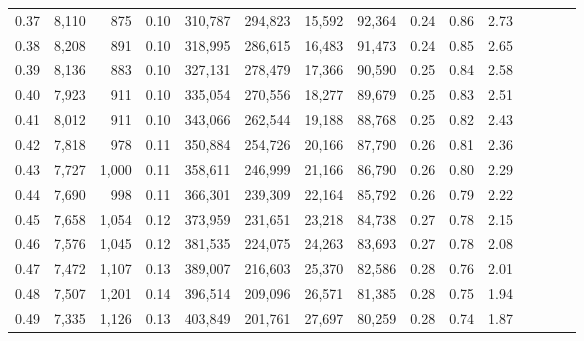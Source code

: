 \begin{tabular}{rrrcrrrrrrrrrrr}
0.37 &  8,110 &    875 &                                       0.10 &  310,787 &  294,823 &   15,592 &   92,364 &  0.24 &  0.86 &                         2.73 \\
0.38 &  8,208 &    891 &                                       0.10 &  318,995 &  286,615 &   16,483 &   91,473 &  0.24 &  0.85 &                         2.65 \\
0.39 &  8,136 &    883 &                                       0.10 &  327,131 &  278,479 &   17,366 &   90,590 &  0.25 &  0.84 &                         2.58 \\
0.40 &  7,923 &    911 &                                       0.10 &  335,054 &  270,556 &   18,277 &   89,679 &  0.25 &  0.83 &                         2.51 \\
0.41 &  8,012 &    911 &                                       0.10 &  343,066 &  262,544 &   19,188 &   88,768 &  0.25 &  0.82 &                         2.43 \\
0.42 &  7,818 &    978 &                                       0.11 &  350,884 &  254,726 &   20,166 &   87,790 &  0.26 &  0.81 &                         2.36 \\
0.43 &  7,727 &  1,000 &                                       0.11 &  358,611 &  246,999 &   21,166 &   86,790 &  0.26 &  0.80 &                         2.29 \\
0.44 &  7,690 &    998 &                                       0.11 &  366,301 &  239,309 &   22,164 &   85,792 &  0.26 &  0.79 &                         2.22 \\
0.45 &  7,658 &  1,054 &                                       0.12 &  373,959 &  231,651 &   23,218 &   84,738 &  0.27 &  0.78 &                         2.15 \\
0.46 &  7,576 &  1,045 &                                       0.12 &  381,535 &  224,075 &   24,263 &   83,693 &  0.27 &  0.78 &                         2.08 \\
0.47 &  7,472 &  1,107 &                                       0.13 &  389,007 &  216,603 &   25,370 &   82,586 &  0.28 &  0.76 &                         2.01 \\
0.48 &  7,507 &  1,201 &                                       0.14 &  396,514 &  209,096 &   26,571 &   81,385 &  0.28 &  0.75 &                         1.94 \\
0.49 &  7,335 &  1,126 &                                       0.13 &  403,849 &  201,761 &   27,697 &   80,259 &  0.28 &  0.74 &                         1.87 \\

\end{tabular}
